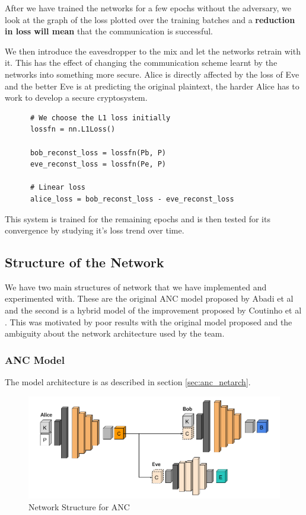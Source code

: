 \documentclass[a4paper]{article}
\begin{document}
    After we have trained the networks for a few epochs without the adversary, we look at the graph
    of the loss plotted over the training batches and a {\bfseries reduction in loss will mean} that
    the communication is successful.

    We then introduce the eavesdropper to the mix and let the networks retrain with it. This has the effect
    of changing the communication scheme learnt by the networks into something more secure. Alice is
    directly affected by the loss of Eve and the better Eve is at predicting the original plaintext, the
    harder Alice has to work to develop a secure cryptosystem.

    \begin{lstlisting}
      # We choose the L1 loss initially
      lossfn = nn.L1Loss()

      bob_reconst_loss = lossfn(Pb, P)
      eve_reconst_loss = lossfn(Pe, P)

      # Linear loss
      alice_loss = bob_reconst_loss - eve_reconst_loss
    \end{lstlisting}

    This system is trained for the remaining epochs and is then tested for its convergence by studying
    it's loss trend over time.

    \subsection{Structure of the Network}
    We have two main structures of network that we have implemented and experimented with. These are
    the original ANC model proposed by Abadi et al \cite{seminalanc} and the second is a hybrid model
    of the improvement proposed by Coutinho et al \cite{perfanc}. This was motivated by poor results
    with the original model proposed and the ambiguity about the network architecture used by the team.

      \subsubsection{ANC Model}
      The model architecture is as described in section \ref{sec:anc_netarch}.

      \begin{figure}[H]
        \centering
        \includegraphics[width=\textwidth]{../ref/ancstruct.png}
        \caption{Network Structure for ANC}
        \label{fig:ancstruct}
      \end{figure}
\end{document}

